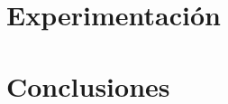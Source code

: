 \documentclass{article}
\begin{document}
\section{Experimentación}





\section{Conclusiones}
\end{document}
